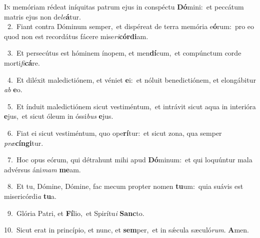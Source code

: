 \lettrine{\initial\textcolor{\initialcolor}{I}}{n} memóriam rédeat iníquitas patrum ejus in conspéctu \textbf{Dó}\-mini:~\star et peccátum matris ejus non de\-\textit{le}\-\textbf{á}tur.\\
{\numbfont\textcolor{\numbcolor}{~2.}}~Fiant contra Dóminum semper,~\dagger et dispéreat de terra memória e\-\textbf{ó}\-rum:~\star pro eo quod non est recordátus fácere mise\-\textit{ri}\-\textbf{cór}\textbf{di}am.\par
{\numbfont\textcolor{\numbcolor}{~3.}}~Et persecútus est hóminem ínopem, et men\-\textbf{dí}\-cum,~\star et compúnctum corde morti\-\textit{fi}\-\textbf{cá}re.\par
{\numbfont\textcolor{\numbcolor}{~4.}}~Et diléxit maledictiónem, et véniet \textbf{e}\-i:~\star et nóluit benedictiónem, et elongábitur \textit{ab} \textbf{e}\-o.\par
{\numbfont\textcolor{\numbcolor}{~5.}}~Et índuit maledictiónem sicut vestiméntum,~\dagger et intrávit sicut aqua in interióra \textbf{e}\-jus,~\star et sicut óleum in óssi\textit{bus} \textbf{e}\-jus.\par
{\numbfont\textcolor{\numbcolor}{~6.}}~Fiat ei sicut vestiméntum, quo ope\-\textbf{rí}\-tur:~\star et sicut zona, qua semper \textit{præ}\-\textbf{cín}\textbf{gi}tur.\par
{\numbfont\textcolor{\numbcolor}{~7.}}~Hoc opus eórum, qui détrahunt mihi apud \textbf{Dó}\-minum:~\star et qui loquúntur mala advérsus áni\textit{mam} \textbf{me}\-am.\par
{\numbfont\textcolor{\numbcolor}{~8.}}~Et tu, Dómine, Dómine, fac mecum propter nomen \textbf{tu}\-um:~\star quia suávis est misericórdi\textit{a} \textbf{tu}\-a.\par
{\numbfont\textcolor{\numbcolor}{~9.}}~Glória Patri, et \textbf{Fí}\-lio,~\star et Spirítu\textit{i} \textbf{Sanc}\-to.\par
{\numbfont\textcolor{\numbcolor}{10.}}~Sicut erat in princípio, et nunc, et \textbf{sem}\-per,~\star et in sǽcula sæculó\-\textit{rum}\-. \textbf{A}\-men.\par
